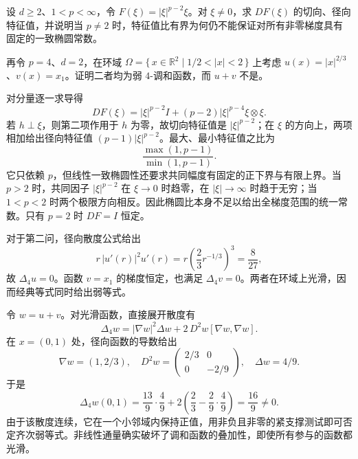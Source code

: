 \begin{exercise}\label{b2:ex:H2-linearization}
设 \(d\ge2\)、\(1<p<\infty\)，令 \(F(\xi)=|\xi|^{p-2}\xi\)。对 \(\xi\ne0\)，求 \(DF(\xi)\) 的切向、径向特征值，并说明当 \(p\ne2\) 时，特征值比有界为何仍不能保证对所有非零梯度具有固定的一致椭圆常数。

\ProseParagraphBreak

再令 \(p=4\)、\(d=2\)，在环域 \(\Omega=\{\,x\in\mathbb R^2\mid1/2<|x|<2\,\}\) 上考虑
\(u(x)=|x|^{2/3}\)、\(v(x)=x_1\)。证明二者均为弱 \(4\)-调和函数，而 \(u+v\) 不是。
\end{exercise}
\begin{solution}
对分量逐一求导得
\[
 DF(\xi)=|\xi|^{p-2}I+(p-2)|\xi|^{p-4}\xi\otimes\xi.
\]
若 \(h\perp\xi\)，则第二项作用于 \(h\) 为零，故切向特征值是 \(|\xi|^{p-2}\)；在 \(\xi\) 的方向上，两项相加给出径向特征值 \((p-1)|\xi|^{p-2}\)。最大、最小特征值之比为
\[
 \frac{\max(1,p-1)}{\min(1,p-1)}.
\]
它只依赖 \(p\)，但线性一致椭圆性还要求共同幅度有固定的正下界与有限上界。当 \(p>2\) 时，共同因子 \(|\xi|^{p-2}\) 在 \(\xi\to0\) 时趋零，在 \(|\xi|\to\infty\) 时趋于无穷；当 \(1<p<2\) 时两个极限方向相反。因此椭圆比本身不足以给出全梯度范围的统一常数。只有 \(p=2\) 时 \(DF=I\) 恒定。

对于第二问，径向散度公式给出
\[
 r\,|u'(r)|^2u'(r)
 =r\left(\frac23r^{-1/3}\right)^3=\frac8{27},
\]
故 \(\Delta_4u=0\)。函数 \(v=x_1\) 的梯度恒定，也满足 \(\Delta_4v=0\)。两者在环域上光滑，因而经典等式同时给出弱等式。

令 \(w=u+v\)。对光滑函数，直接展开散度有
\[
 \Delta_4w=|\nabla w|^2\Delta w
                 +2\,D^2w[\nabla w,\nabla w].
\]
在 \(x=(0,1)\) 处，径向函数的导数给出
\[
 \nabla w=(1,2/3),\quad
 D^2w=\begin{pmatrix}2/3&0\\0&-2/9\end{pmatrix},\quad
 \Delta w=4/9.
\]
于是
\[
 \Delta_4w(0,1)
 =\frac{13}{9}\cdot\frac49
   +2\left(\frac23-\frac29\cdot\frac49\right)
 =\frac{16}{9}\ne0.
\]
由于该散度连续，它在一个小邻域内保持正值，用非负且非零的紧支撑测试即可否定齐次弱等式。非线性通量确实破坏了调和函数的叠加性，即使所有参与的函数都光滑。
\end{solution}

